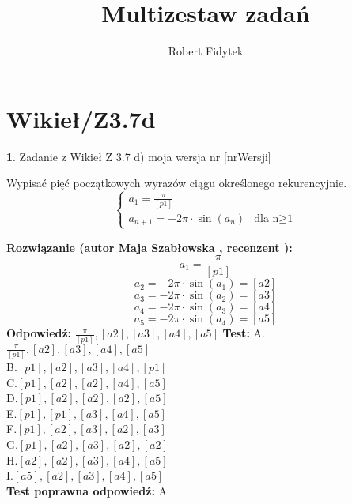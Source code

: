 \documentclass[12pt, a4paper]{article}
\title{Multizestaw zadań}
\author{Robert Fidytek}
\date{}
\theoremstyle{definition} %
\newtheorem{zad}{}
\newcommand{\kategoria}[1]{\section{#1}} %
\newcommand{\zadStart}[1]{\begin{zad}#1\newline} %
\newcommand{\zadStop}{\end{zad}}   %
\newcommand{\rozwStart}[2]{\noindent \textbf{Rozwiązanie (autor #1 , recenzent #2): }\newline} %
\newcommand{\rozwStop}{\newline}                                            %
\newcommand{\odpStart}{\noindent \textbf{Odpowiedź:}\newline}    %
\newcommand{\odpStop}{\newline}                                             %
\newcommand{\testStart}{\noindent \textbf{Test:}\newline} %
\newcommand{\testStop}{\newline} %
\newcommand{\kluczStart}{\noindent \textbf{Test poprawna odpowiedź:}\newline} %
\newcommand{\kluczStop}{\newline} %
\begin{document}
\maketitle


\kategoria{Wikieł/Z3.7d}
\zadStart{Zadanie z Wikieł Z 3.7 d)  moja wersja nr [nrWersji]}

Wypisać pięć początkowych wyrazów ciągu określonego rekurencyjnie.
$$\left\{ \begin{array}{ll}
a_{1}=\frac{\pi}{[p1]}\\
a_{n+1}=-2\pi\cdot \sin(a_{n})& \textrm{dla n$\geq$1} 
\end{array} \right.
$$
\zadStop
\rozwStart{Maja Szabłowska}{}
$$a_{1}=\frac{\pi}{[p1]}$$
$$a_{2}=-2\pi\cdot\sin(a_{1})=[a2]$$
$$a_{3}=-2\pi\cdot\sin(a_{2})=[a3]$$
$$a_{4}=-2\pi\cdot\sin(a_{3})=[a4]$$
$$a_{5}=-2\pi\cdot\sin(a_{4})=[a5]$$
\rozwStop
\odpStart
$\frac{\pi}{[p1]},[a2],[a3],[a4],[a5]$
\odpStop
\testStart
A.$\frac{\pi}{[p1]},[a2],[a3],[a4],[a5]$\\
B.$[p1],[a2],[a3],[a4],[p1]$\\
C.$[p1],[a2],[a2],[a4],[a5]$\\
D.$[p1],[a2],[a2],[a2],[a5]$\\
E.$[p1],[p1],[a3],[a4],[a5]$\\
F.$[p1],[a2],[a3],[a2],[a3]$\\
G.$[p1],[a2],[a3],[a2],[a2]$\\
H.$[a2],[a2],[a3],[a4],[a5]$\\
I.$[a5],[a2],[a3],[a4],[a5]$\\
\testStop
\kluczStart
A
\kluczStop
\end{document}
